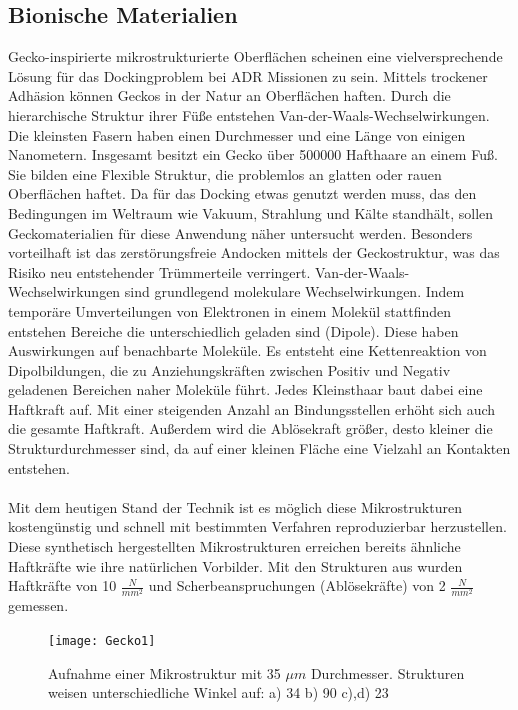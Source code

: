		\subsection{Bionische Materialien}%
Gecko-inspirierte mikrostrukturierte Oberflächen scheinen eine vielversprechende Lösung für das Dockingproblem bei ADR Missionen zu sein. Mittels trockener Adhäsion können Geckos in der Natur an Oberflächen haften. Durch die hierarchische Struktur ihrer Füße entstehen Van-der-Waals-Wechselwirkungen. Die kleinsten Fasern haben einen Durchmesser und eine Länge von einigen Nanometern. Insgesamt besitzt ein Gecko über 500000 Hafthaare an einem Fuß. Sie bilden eine Flexible Struktur, die problemlos an glatten oder rauen Oberflächen haftet. Da für das Docking etwas genutzt werden muss, das den Bedingungen im Weltraum wie Vakuum, Strahlung und Kälte standhält, sollen Geckomaterialien für diese Anwendung näher untersucht werden. Besonders vorteilhaft ist das zerstörungsfreie Andocken mittels der Geckostruktur, was das Risiko neu entstehender Trümmerteile verringert.
Van-der-Waals-Wechselwirkungen sind grundlegend molekulare Wechselwirkungen. Indem temporäre Umverteilungen von Elektronen in einem Molekül stattfinden entstehen Bereiche die unterschiedlich geladen sind (Dipole). Diese haben Auswirkungen auf benachbarte Moleküle. Es entsteht eine Kettenreaktion von Dipolbildungen, die zu Anziehungskräften zwischen Positiv und Negativ geladenen Bereichen naher Moleküle führt. Jedes Kleinsthaar baut dabei eine Haftkraft auf. Mit einer steigenden Anzahl an Bindungsstellen erhöht sich auch die gesamte Haftkraft. Außerdem wird die Ablösekraft größer, desto kleiner die Strukturdurchmesser sind, da auf einer kleinen Fläche eine Vielzahl an Kontakten entstehen. \cite{Schwerter.}\\
\\
Mit dem heutigen Stand der Technik ist es möglich diese Mikrostrukturen kostengünstig und schnell mit bestimmten Verfahren reproduzierbar herzustellen. Diese synthetisch hergestellten Mikrostrukturen erreichen bereits ähnliche Haftkräfte wie ihre natürlichen Vorbilder. Mit den Strukturen aus  wurden Haftkräfte von 10 $\frac{N}{mm^{2}}$ und Scherbeanspruchungen (Ablösekräfte)  von 2 $\frac{N}{mm^{2}}$ gemessen.
	\begin{figure}[h]
	\centering
		\texttt{[image: Gecko1]}
	\caption{Aufnahme einer Mikrostruktur mit 35 $\mu m$ Durchmesser. Strukturen weisen unterschiedliche Winkel auf: a) 	34\textdegree{}  b) 90\textdegree{}  c),d) 23\textdegree{} \cite{Schwerter.}}
	\label{fig:Gecko1}
\end{figure}
